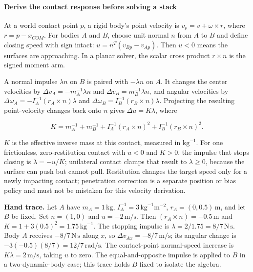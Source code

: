 \paragraph{Derive the contact response before solving a stack}\label{derive-the-contact-response-before-solving-a-stack}

At a world contact point \(p\), a rigid body's point velocity is \(v_p=v+\omega\times r\), where \(r=p-x_{COM}\). For bodies \(A\) and \(B\), choose unit normal \(n\) from \(A\) to \(B\) and define closing speed with sign intact: \(u=n^T(v_{Bp}-v_{Ap})\). Then \(u<0\) means the surfaces are approaching. In a planar solver, the scalar cross product \(r\times n\) is the signed moment arm.

A normal impulse \(\lambda n\) on \(B\) is paired with \(-\lambda n\) on \(A\). It changes the center velocities by \(\Delta v_A=-m_A^{-1}\lambda n\) and \(\Delta v_B=m_B^{-1}\lambda n\), and angular velocities by \(\Delta\omega_A=-I_A^{-1}(r_A\times n)\lambda\) and \(\Delta\omega_B=I_B^{-1}(r_B\times n)\lambda\). Projecting the resulting point-velocity changes back onto \(n\) gives \(\Delta u=K\lambda\), where

\[
K=m_A^{-1}+m_B^{-1}+I_A^{-1}(r_A\times n)^2+I_B^{-1}(r_B\times n)^2.
\]

\(K\) is the effective inverse mass at this contact, measured in \(\mathrm{kg}^{-1}\). For one frictionless, zero-restitution contact with \(u<0\) and \(K>0\), the impulse that stops closing is \(\lambda=-u/K\); unilateral contact clamps that result to \(\lambda\ge0\), because the surface can push but cannot pull. Restitution changes the target speed only for a newly impacting contact; penetration correction is a separate position or bias policy and must not be mistaken for this velocity derivation.

\textbf{Hand trace.} Let \(A\) have \(m_A=1\,\mathrm{kg}\), \(I_A^{-1}=3\,\mathrm{kg}^{-1}\mathrm m^{-2}\), \(r_A=(0,0.5)\,\mathrm m\), and let \(B\) be fixed. Set \(n=(1,0)\) and \(u=-2\,\mathrm{m/s}\). Then \((r_A\times n)=-0.5\,\mathrm m\) and \(K=1+3(0.5)^2=1.75\,\mathrm{kg}^{-1}\). The stopping impulse is \(\lambda=2/1.75=8/7\,\mathrm{N\,s}\). Body \(A\) receives \(-8/7\,\mathrm{N\,s}\) along \(x\), so \(\Delta v_{Ax}=-8/7\,\mathrm{m/s}\); its angular change is \(-3(-0.5)(8/7)=12/7\,\mathrm{rad/s}\). The contact-point normal-speed increase is \(K\lambda=2\,\mathrm{m/s}\), taking \(u\) to zero. The equal-and-opposite impulse is applied to \(B\) in a two-dynamic-body case; this trace holds \(B\) fixed to isolate the algebra.

